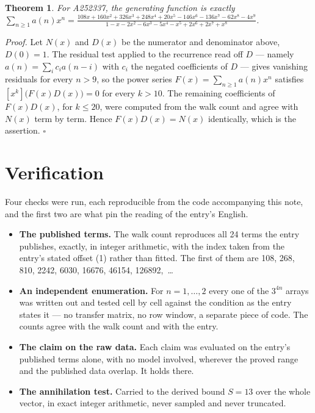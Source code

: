\documentclass[11pt]{article}
\newtheorem{theorem}{Theorem}
\theoremstyle{definition}
\begin{document}
\begin{theorem} For A252337, the generating function is exactly $\sum_{n\ge 1} a(n)x^n = \frac{108x + 160x^{2} + 326x^{3} + 248x^{4} + 20x^{5} - 146x^{6} - 136x^{7} - 62x^{8} - 4x^{9}}{1 - x - 2x^{2} - 6x^{3} - 5x^{4} - x^{5} + 2x^{6} + 2x^{7} + x^{8}}$.\end{theorem}

{\itshape Proof.} Let $N(x)$ and $D(x)$ be the numerator and denominator above, $D(0)=1$. The residual test applied to the recurrence read off $D$ --- namely $a(n) = \sum_i c_i a(n-i)$ with $c_i$ the negated coefficients of $D$ --- gives vanishing residuals for every $n > 9$, so the power series $F(x)=\sum_{n\ge 1}a(n)x^n$ satisfies $[x^k]\bigl(F(x)D(x)\bigr) = 0$ for every $k > 10$. The remaining coefficients of $F(x)D(x)$, for $k \le 20$, were computed from the walk count and agree with $N(x)$ term by term. Hence $F(x)D(x) = N(x)$ identically, which is the assertion. $\square$

\section{Verification}

Four checks were run, each reproducible from the code accompanying this note, and the first two are what pin the reading of the entry's English.

\begin{itemize}

\item {\bfseries The published terms.} The walk count reproduces all 24 terms the entry publishes, exactly, in integer arithmetic, with the index taken from the entry's stated offset (1) rather than fitted. The first of them are 108, 268, 810, 2242, 6030, 16676, 46154, 126892,~\dots

\item {\bfseries An independent enumeration.} For $n = 1,\dots,2$ every one of the $3^{4n}$ arrays was written out and tested cell by cell against the condition as the entry states it --- no transfer matrix, no row window, a separate piece of code. The counts agree with the walk count and with the entry.

\item {\bfseries The claim on the raw data.} Each claim was evaluated on the entry's published terms alone, with no model involved, wherever the proved range and the published data overlap. It holds there.

\item {\bfseries The annihilation test.} Carried to the derived bound $S = 13$ over the whole vector, in exact integer arithmetic, never sampled and never truncated.

\end{itemize}
\end{document}
